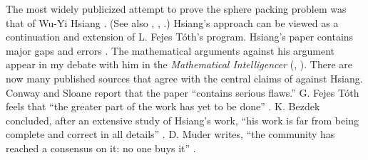 \smallskip
The most widely publicized attempt to prove the sphere packing problem
was that of Wu-Yi Hsiang \cite{Hsi93}.  (See also \cite{Hsi93a},
\cite{Hsi93b}, \cite{Hsi02}.)  Hsiang's approach can be viewed as
a continuation and extension of L. Fejes T\'oth's program.
Hsiang's paper contains major gaps and errors \cite{CoHMS94}.
  The mathematical arguments against his argument appear
in my
debate with him in the {\it Mathematical Intelligencer}
(\cite{Hal94}, \cite{Hsi95}).
There are now many published sources that agree with the central
claims of \cite{Hal94} against Hsiang.
Conway and Sloane report that the paper ``contains serious flaws.''
G. Fejes T\'oth feels that ``the greater part of the work has yet
to be done'' \cite{Fej95}.   K. Bezdek concluded,
after an extensive study of Hsiang's work, ``his work is far from being
complete and correct in all details'' \cite{Bez97}.
 D. Muder writes, ``the
community has reached a consensus on it: no one buys it'' \cite{Mud97}.



